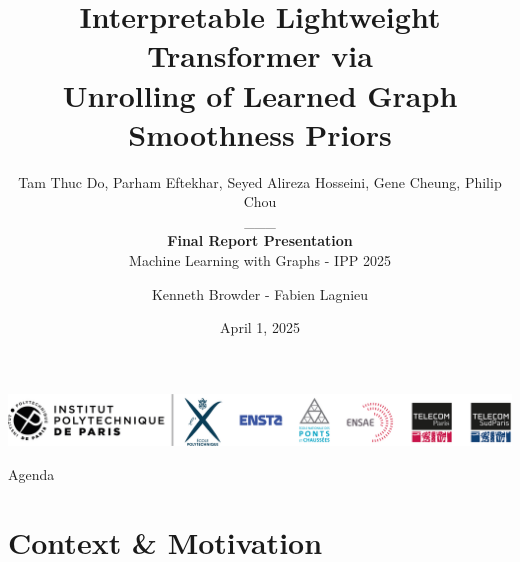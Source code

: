 \documentclass[aspectratio=169,xcolor=dvipsnames]{beamer}
\title{Interpretable Lightweight Transformer via \\ Unrolling of Learned Graph Smoothness Priors}
\subtitle{Tam Thuc Do, Parham Eftekhar, Seyed Alireza Hosseini, Gene Cheung, Philip Chou\\ ___ \\ \textbf{Final Report Presentation} \\ Machine Learning with Graphs - IPP 2025}
\author{Kenneth Browder - Fabien Lagnieu}
\institute{Institut Polytechnique de Paris}
\date{April 1, 2025}
\begin{document}

\begin{frame}
    \titlepage
    \begin{center}
        \includegraphics[width=0.7\linewidth]{IPP-Horizontal.png}
    \end{center}
\end{frame}


\begin{frame}{Agenda}
    \tableofcontents
\end{frame}

\section{Context \& Motivation}
\end{document}
